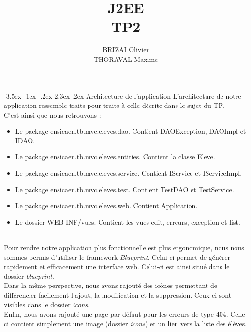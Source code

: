 \documentclass[a4paper,12pt]{article}
\makeatletter
\renewcommand\section{\@startsection {section}{1}{\z@}%
                           {-3.5ex \@plus -1ex \@minus -.2ex}%
                           {2.3ex \@plus.2ex}%
                           {\normalfont\Large\bfseries}}
\makeatother
\begin{document}
\newpage
\title{J2EE\\TP2}
\date{}
\author{BRIZAI Olivier\\THORAVAL Maxime}
\maketitle

\newpage
\section{Architecture de l'application}
L'architecture de notre application ressemble traits pour traits à celle décrite dans le sujet du TP.\\
C'est ainsi que nous retrouvons :
\begin{itemize}
	\item Le package ensicaen.tb.mvc.eleves.dao. Contient DAOException, DAOImpl et IDAO.
	\item Le package ensicaen.tb.mvc.eleves.entities. Contient la classe Eleve.
	\item Le package ensicaen.tb.mvc.eleves.service. Contient IService et IServiceImpl.
	\item Le package ensicaen.tb.mvc.eleves.test. Contient TestDAO et TestService.
	\item Le package ensicaen.tb.mvc.eleves.web. Contient Application.
	\item Le dossier WEB-INF/vues. Contient les vues edit, erreurs, exception et list.
\end{itemize}
~\\

Pour rendre notre application plus fonctionnelle est plus ergonomique, nous nous sommes permis d'utiliser le framework \textit{Blueprint}.
Celui-ci permet de générer rapidement et efficacement une interface web. Celui-ci est ainsi situé dans le dossier \textit{blueprint}.\\
Dans la même perspective, nous avons rajouté des icônes permettant de différencier facilement l'ajout, la modification et la suppression. 
Ceux-ci sont visibles dans le dossier \textit{icons}.\\
Enfin, nous avons rajouté une page par défaut pour les erreurs de type 404. Celle-ci contient simplement une image (dossier \textit{icons}) et
un lien vers la liste des élèves.
\end{document}

